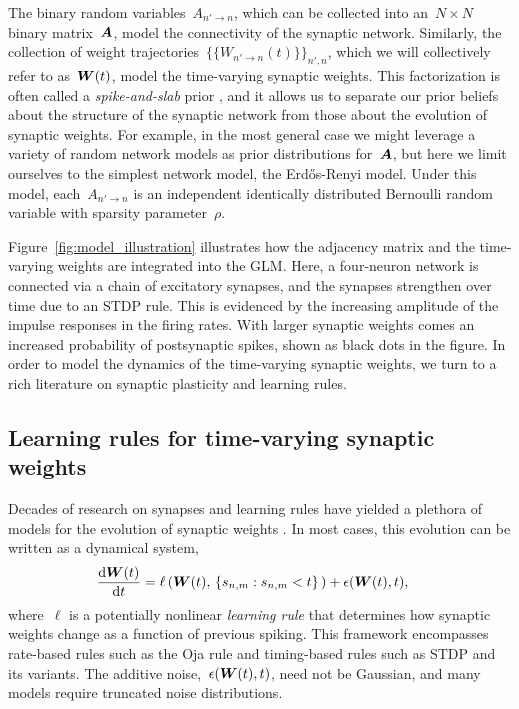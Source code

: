 The binary random variables~$A_{n' \to n}$, which can be collected
into an~${N\times N}$ binary matrix~$\boldsymbol{A}$, model the connectivity of
the synaptic network. Similarly, the collection of weight
trajectories~${\{\{W_{n' \to n}(t)\}\}_{n',n}}$, which we will
collectively refer to as~$\boldsymbol{W}(t)$, model the time-varying synaptic
weights. This factorization is often called a \emph{spike-and-slab}
prior \cite{Mitchell1988}, and it allows us to separate our prior
beliefs about the structure of the synaptic network from those about
the evolution of synaptic weights. For example, in the most general
case we might leverage a variety of random network models
\cite{Lloyd-2012} as prior distributions for~$\boldsymbol{A}$, but here we limit
ourselves to the simplest network model, the Erd\H{o}s-Renyi
model. Under this model, each~$A_{n' \to n}$ is an independent
identically distributed Bernoulli random variable with sparsity
parameter~$\rho$.

Figure~\ref{fig:model_illustration} illustrates how the adjacency
matrix and the time-varying weights are integrated into the GLM. Here,
a four-neuron network is connected via a chain of excitatory synapses,
and the synapses strengthen over time due to an STDP rule. This is
evidenced by the increasing amplitude of the impulse responses in the
firing rates.  With larger synaptic weights comes an increased
probability of postsynaptic spikes, shown as black dots in the
figure. In order to model the dynamics of the time-varying synaptic
weights, we turn to a rich literature on synaptic plasticity and
learning rules.

\subsection{Learning rules for time-varying synaptic weights}
Decades of research on synapses and learning rules have yielded a
plethora of models for the evolution of synaptic weights
\cite{Caporale-2008}. In most cases, this evolution can be written as
a dynamical system,
\begin{align*} \frac{\mathrm{d} \boldsymbol{W}(t)}{\mathrm{d} t} &= \ell\left(\boldsymbol{W}(t), \, \{s_{n,m} : s_{n,m} < t\} \,\right) + \epsilon(\boldsymbol{W}(t), t),
\end{align*}
where~$\ell$ is a potentially nonlinear \emph{learning rule} that
determines how synaptic weights change as a function of previous
spiking. This framework encompasses rate-based rules such as the Oja
rule \cite{Oja-1982} and timing-based rules such as STDP and its
variants. The additive noise,~${\epsilon(\boldsymbol{W}(t), t)}$, need not be
Gaussian, and many models require truncated noise distributions.

